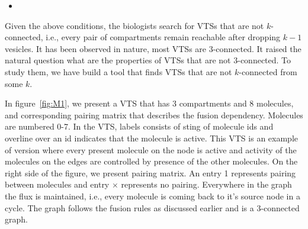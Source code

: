 \begin{itemize}
\item {}
\end{itemize}


Given the above conditions, the biologists search for VTSs that are
not $k$-connected, i.e., every pair of compartments remain reachable
after dropping $k-1$ vesicles.
%
It has been observed in nature, most VTSs are 3-connected.
%
It raised the natural question what are the properties of VTSs
that are not 3-connected.
%
To study them, we have build a tool that finds VTSs that are not
$k$-connected from some $k$.




\begin{example}
%
In figure~\ref{fig:M1}, we present a VTS that has 3
compartments and 8 molecules, and corresponding pairing matrix that
describes the fusion dependency.
%
Molecules are numbered 0-7.
%
In the VTS, labels consists of sting of molecule ids and overline
over an id indicates that the molecule is active.
%
This VTS is an example of version where every present molecule on
the node is active and activity of the molecules on the
edges are controlled by presence of the other molecules.
%
On the right side of the figure, we present pairing matrix.
%
An entry 1 represents pairing between molecules and
entry $\times$ represents no pairing.
%
Everywhere in the graph the flux is maintained, i.e.,
every molecule is coming back to it's source node in a cycle.
%
The graph follows the fusion rules as discussed earlier and
is a 3-connected graph.
\end{example}



